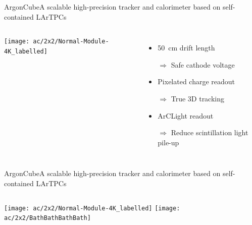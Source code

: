 \documentclass[]{beamer}
\newcommand*{\emphcol}{red}
\newcommand*{\emphcoltitle}{blue}
\newcommand*{\AC}{{ArgonCube}}
\newcommand*{\AL}{{ArCLight}}
\newcommand*{\lartpc}{{LArTPC}}
\begin{document}
\begin{frame}{\AC{}}{\color{\emphcoltitle}A scalable high-precision tracker and calorimeter based on self-contained \lartpc{}s}
	\begin{columns}[c]
		\centering
		\texttt{[image: ac/2x2/Normal-Module-4K\_labelled]}
		\begin{itemize}
			\item \SI{50}{\centi\metre} drift length
			\item[$\Rightarrow$] {\color{\emphcol} Safe cathode voltage}
			\item Pixelated charge readout
			\item[$\Rightarrow$] {\color{\emphcol} True 3D tracking}
			\item \AL{} readout
			\item[$\Rightarrow$] {\color{\emphcol} Reduce scintillation light pile-up}
		\end{itemize}
	\end{columns}
\end{frame}

\begin{frame}{\AC{}}{\color{\emphcoltitle}A scalable high-precision tracker and calorimeter based on self-contained \lartpc{}s}
	\begin{columns}[c]
		\centering
		\texttt{[image: ac/2x2/Normal-Module-4K\_labelled]}
		\centering
		\texttt{[image: ac/2x2/BathBathBathBath]}
	\end{columns}
\end{frame}
\end{document}
